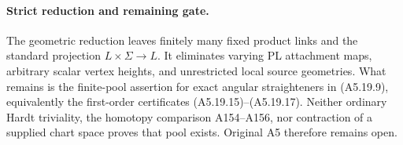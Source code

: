 \paragraph{Strict reduction and remaining gate.}
The geometric reduction leaves finitely many fixed product links and the
standard projection $L\times\Sigma\to L$. It eliminates varying PL
attachment maps, arbitrary scalar vertex heights, and unrestricted local
source geometries. What remains is the finite-pool assertion for exact
angular straighteners in (A5.19.9), equivalently the first-order certificates
(A5.19.15)--(A5.19.17). Neither ordinary Hardt triviality, the homotopy
comparison A154--A156, nor contraction of a supplied chart space proves
that pool exists. Original A5 therefore remains open.
